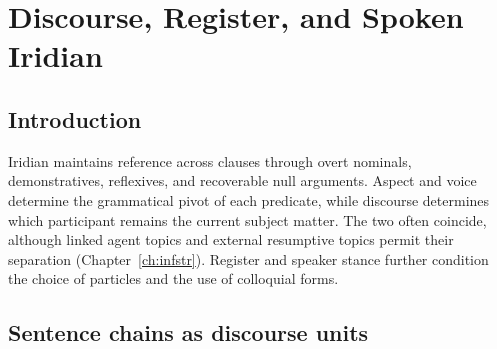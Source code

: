 \chapter{Discourse, Register, and Spoken Iridian}
\label{ch:discourse}\label{ch:spoken}\label{ch:semantics}


\section{Introduction}\label{sec:discourse-intro}

Iridian maintains reference across clauses through overt nominals,
 demonstratives, reflexives, and recoverable null arguments. Aspect and voice
 determine the grammatical pivot of each predicate, while discourse determines
 which participant remains the current subject matter. The two often
 coincide, although linked agent topics and external resumptive topics permit
 their separation (Chapter~\ref{ch:infstr}). Register and speaker stance
 further condition the choice of particles and the use of colloquial forms.

%
%

\section{Sentence chains as discourse units}\label{sec:discourse-chains}


